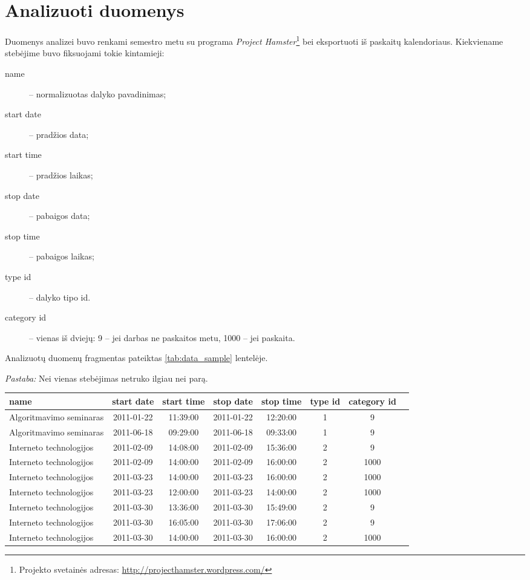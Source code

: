 \chapter{Analizuoti duomenys}

Duomenys analizei buvo renkami semestro metu su programa
\emph{Project Hamster}\footnote{
Projekto svetainės adresas: \url{http://projecthamster.wordpress.com/}}
bei eksportuoti iš paskaitų kalendoriaus. Kiekviename stebėjime buvo
fiksuojami tokie kintamieji:
\begin{description}
  \item[name] – normalizuotas dalyko pavadinimas;
  \item[start date] – pradžios data;
  \item[start time] – pradžios laikas;
  \item[stop date] – pabaigos data;
  \item[stop time] – pabaigos laikas;
  \item[type id] – dalyko tipo id.
  \item[category id] – vienas iš dviejų: 9 – jei darbas ne paskaitos metu, 
    1000 – jei paskaita.
\end{description}
Analizuotų duomenų fragmentas pateiktas \ref{tab:data_sample} lentelėje.

\emph{Pastaba:} Nei vienas stebėjimas netruko ilgiau nei parą.


\begin{sidewaystable}[ht!]
  \centering
  \begin{tabular}{|l|c|c|c|c|c|c|c|}
\hline
  { \bf name }              & { \bf start date} & { \bf start time} & { \bf stop date} 
  &  { \bf stop time} & { \bf type id} & { \bf category id}\\
\hline
Algoritmavimo seminaras&2011-01-22&11:39:00&2011-01-22&12:20:00&1&9\\
Algoritmavimo seminaras&2011-06-18&09:29:00&2011-06-18&09:33:00&1&9\\
Interneto technologijos&2011-02-09&14:08:00&2011-02-09&15:36:00&2&9\\
Interneto technologijos&2011-02-09&14:00:00&2011-02-09&16:00:00&2&1000\\
Interneto technologijos&2011-03-23&14:00:00&2011-03-23&16:00:00&2&1000\\
Interneto technologijos&2011-03-23&12:00:00&2011-03-23&14:00:00&2&1000\\
Interneto technologijos&2011-03-30&13:36:00&2011-03-30&15:49:00&2&9\\
Interneto technologijos&2011-03-30&16:05:00&2011-03-30&17:06:00&2&9\\
Interneto technologijos&2011-03-30&14:00:00&2011-03-30&16:00:00&2&1000\\
\hline
  \end{tabular}
  \caption{Duomenų pavyzdys.}
  \label{tab:data_sample}
\end{sidewaystable}


